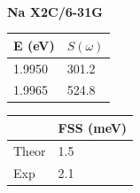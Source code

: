 \documentclass{beamer}
\begin{document}
\begin{frame}
\begin{minipage}[h!]{0.50\textwidth}
\begin{minipage}[h!]{0.47\textwidth}
\small
~\\
\textbf{Na X2C/6-31G}
\vspace{-0.5cm}
\begin{table}
\begin{tabular}{|l|l|}
\hline
E (eV) & $S(\omega)$ \\
\hline
\hline
1.9950 & 301.2\\
1.9965 & 524.8\\
\hline
\end{tabular}
\end{table}
\vspace{-0.5cm}
\begin{table}
\begin{tabular}{|l|l|}
\hline
 & FSS (meV) \\
\hline
\hline
Theor & 1.5\\
Exp & 2.1\\
\hline
\end{tabular}
\end{table}
\end{minipage}

\end{minipage}
\end{frame}
\end{document}
